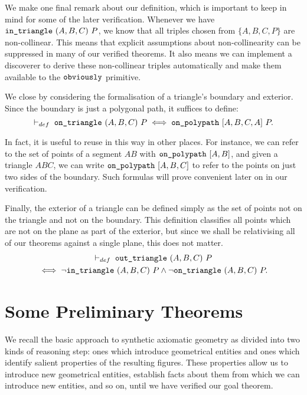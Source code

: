 
We make one final remark about our definition, which is important to keep in mind for some of the later verification. Whenever we have $\texttt{in\_triangle}\ (A,B,C)\ P$, we know that all triples chosen from $\{A,B,C,P\}$ are non-collinear. This means that explicit assumptions about non-collinearity can be suppressed in many of our verified theorems. It also means we can implement a discoverer  to derive these non-collinear triples automatically and make them available to the $\texttt{obviously}$ primitive. 

We close by considering the formalisation of a triangle's boundary and exterior. Since the boundary is just a polygonal path, it suffices to define:
\begin{equation}\label{eq:onTriangleDef}
\vdash_{def}\;\code{on\_triangle}\ (A,B,C)\ P \iff \code{on\_polypath}\ [A,B,C,A]\ P.
\end{equation}

In fact, it is useful to reuse  in this way in other places. For instance, we can refer to the set of points of a segment $AB$ with $\texttt{on\_polypath}\ [A,B]$, and given a triangle $ABC$, we can write $\code{on\_polypath}\ [A,B,C]$ to refer to the points on just two sides of the boundary. Such formulas will prove convenient later on in our verification.

Finally, the exterior of a triangle can be defined simply as the set of points not on the triangle and not on the boundary. This definition classifies all points which are not on the plane as part of the exterior, but since we shall be relativising all of our theorems against a single plane, this does not matter.
\begin{multline*}
  \vdash_{def}\;\code{out\_triangle}\ (A,B,C)\ P\\
  \iff \neg\code{in\_triangle}\ (A,B,C)\ P\wedge\neg\code{on\_triangle}\ (A,B,C)\ P.
\end{multline*}

\section{Some Preliminary Theorems}
We recall the basic approach to synthetic axiomatic geometry as divided into two kinds of reasoning step: ones which introduce geometrical entities and ones which identify salient properties of the resulting figures. These properties allow us to introduce new geometrical entities, establish facts about them from which we can introduce new entities, and so on, until we have verified our goal theorem. 

